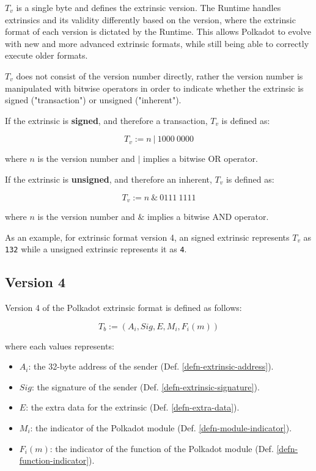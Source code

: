 \begin{definition}
    \label{defn-extrinsic-version}
    $T_v$ is a single byte and defines the extrinsic version. The Runtime
    handles extrinsics and its validity differently based on the version, where
    the extrinsic format of each version is dictated by the Runtime. This allows
    Polkadot to evolve with new and more advanced extrinsic formats, while still
    being able to correctly execute older formats.
    \newline

    $T_v$ does not consist of the version number directly, rather the version
    number is manipulated with bitwise operators in order to indicate whether
    the extrinsic is signed ("transaction") or unsigned ("inherent").
    \newline

    If the extrinsic is \textbf{signed}, and therefore a transaction, $T_v$ is
    defined as:

    \[
        T_v := n \ | \ 1000 \ 0000
    \]

    where $n$ is the version number and $|$ implies a bitwise OR operator.
    \newline
    \newpage

    If the extrinsic is \textbf{unsigned}, and therefore an inherent, $T_v$ is
    defined as:

    \[
        T_v := n \ \& \ 0111 \ 1111
    \]

    where $n$ is the version number and $\&$ implies a bitwise AND operator.
    \newline

    As an example, for extrinsic format version 4, an signed extrinsic
    represents $T_v$ as \verb|132| while a unsigned extrinsic represents it as
    \verb|4|.
\end{definition}

\subsection{Version 4}

Version 4 of the Polkadot extrinsic format is defined as follows:

\[
    T_b := (A_i, Sig, E, M_i, F_i(m))
\]

where each values represents:
\begin{itemize}
    \item $A_i$: the 32-byte address of the sender (Def. \ref{defn-extrinsic-address}).
    \item $Sig$: the signature of the sender (Def. \ref{defn-extrinsic-signature}).
    \item $E$: the extra data for the extrinsic (Def. \ref{defn-extra-data}).
    \item $M_i$: the indicator of the Polkadot module (Def. \ref{defn-module-indicator}).
    \item $F_i(m)$: the indicator of the function of the Polkadot module (Def. \ref{defn-function-indicator}).
\end{itemize}

